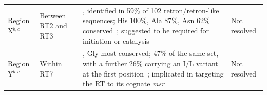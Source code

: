 \begin{longtable}{@{}L{0.13\rtwd} L{0.18\rtwd} L{0.35\rtwd} L{0.34\rtwd}@{}}
Region X$^{b,c}$ & Between RT2 and RT3 &
  , identified in 59\% of 102 retron/retron-like sequences; His 100\%, Ala 87\%, Asn 62\% conserved~\cite{toro2014}; suggested to be required for initiation or catalysis~\cite{mestre2020} &
  Not resolved \\[3pt]
  
Region Y$^{b,c}$ & Within RT7 &
  , Gly most conserved; 47\% of the same set, with a further 26\% carrying an I/L variant at the first position~\cite{toro2014}; implicated in targeting the RT to its cognate \textit{msr}~\cite{inouye1999,mestre2020} &
  Not resolved \\

\end{longtable}
\endgroup


\newcommand{\algn}{\ensuremath{\bullet}}
\newcommand{\prtl}{\ensuremath{\circ}}
\newcommand{\nalg}{\textendash}

